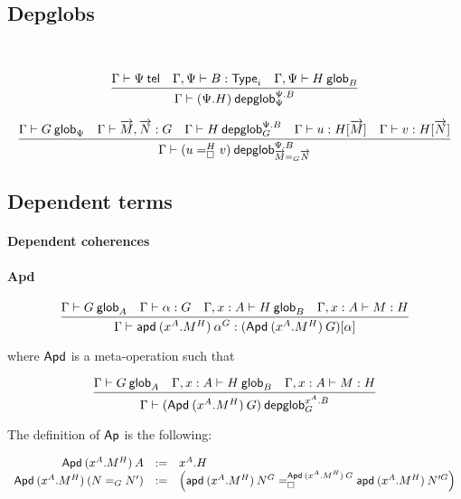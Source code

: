 \subsection{Depglobs}

\\

\begin{small}
  \[\infer{\wfdepglob{\Gamma}{(\Psi.H)}{0,m}{\Psi.B}{\Psi}}
  {\wftel{\Gamma}{\Psi}
    & \wftype{\Gamma,\Psi}{B}
    & \wfglob{\Gamma,\Psi}{H}{}{B}
  }\]

  \[\infer{\wfdepglob{\Gamma}{(\dhomj{H}{u}{v}{\blank})}{n+1,m}
    {\Psi.B}{\homj{G}{\tel{M}}{\tel{N}}}}
  {\wfglob{\Gamma}{G}{n}{\Psi}
    & \ofglob{\Gamma}{\tel{M},\tel{N}}{G}
    & \wfdepglob{\Gamma}{H}{n,m}{\Psi.B}{G}
    & \ofdepglob{\Gamma}{u}{H}{\tel{M}}
    & \ofdepglob{\Gamma}{v}{H}{\tel{N}}}\]
\end{small}

\subsection{Dependent terms}

\paragraph{Dependent coherences}



\paragraph{Apd}

\begin{small}
  \[\infer{\ofdepglob{\Gamma}{\apd{(x^A.M^H)}{\alpha^G}}
    {(\Apd{(x^A.M^H)}{G})}{\alpha}}
  {\wfglob{\Gamma}{G}{n}{A}
    & \ofglob{\Gamma}{\alpha}{G}
    & \wfglob{\Gamma,x:A}{H}{m}{B}
    & \ofglob{\Gamma,x:A}{M}{H}}\]

  where $\dsd{Apd}$ is a meta-operation such that

  \[\infer{\wfdepglob{\Gamma}{(\Apd{(x^A.M^H)}{G})}{n,m}
    {x^A.B}{G}}
  {\wfglob{\Gamma}{G}{n}{A}
    & \wfglob{\Gamma,x:A}{H}{m}{B}
    & \ofglob{\Gamma,x:A}{M}{H}}\]

  The definition of $\dsd{Ap}$ is the following:

  \[
  \begin{array}{rcl}
    \Apd{(x^A.M^H)}{A} & := & x^A.H \\
    \Apd{(x^A.M^H)}{(\homj{G}{N}{N'})} & := & \left(
      \dhomj{\Apd{(x^A.M^H)}{G}}
      {\apd{(x^A.M^H)}{N^G}}{\apd{(x^A.M^H)}{N'^G}}{\blank}\right)
  \end{array}
  \]
\end{small}

